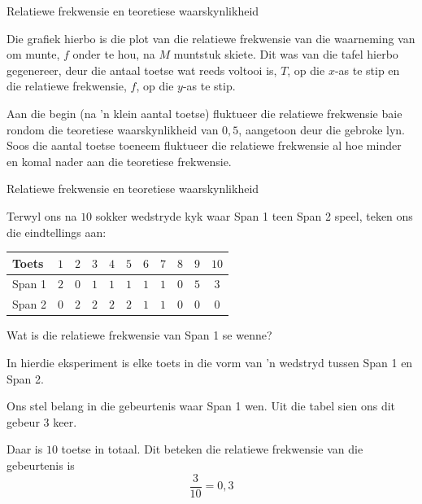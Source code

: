 \begin{wex}{Relatiewe frekwensie en teoretiese waarskynlikheid}
{Die grafiek hierbo is die plot van die relatiewe frekwensie van die waarneming van om munte, $ f $ onder te hou,
na $ M $ muntstuk skiete. Dit was van die tafel hierbo gegenereer, deur die antaal toetse wat reeds voltooi is, $ T $, op die
$ x $-as te stip en die relatiewe frekwensie, $ f $, op die $ y $-as te stip.

Aan die begin (na 'n klein aantal toetse) fluktueer die relatiewe frekwensie baie rondom die teoretiese waarskynlikheid van $0,5$, aangetoon deur die gebroke lyn. Soos die aantal toetse toeneem fluktueer die relatiewe frekwensie al hoe minder en komal nader aan die teoretiese frekwensie.


}
\end{wex}


\begin{wex}{Relatiewe frekwensie en teoretiese waarskynlikheid}{
  Terwyl ons na $10$ sokker wedstryde kyk waar Span 1 teen Span 2 speel, teken ons die eindtellings aan:
    \begin{center}
      \begin{tabular}{lcccccccccc}
        \toprule
        Toets  & $1$ & $2$ & $3$ & $4$ & $5$ & $6$ & $7$ & $8$ & $9$ & $10$ \\
        \midrule
        Span 1 & $2$ & $0$ & $1$ & $1$ & $1$ & $1$ & $1$ & $0$ & $5$ & $3$ \\
        Span 2 & $0$ & $2$ & $2$ & $2$ & $2$ & $1$ & $1$ & $0$ & $0$ & $0$ \\
        \bottomrule
      \end{tabular}
    \end{center}
  Wat is die relatiewe frekwensie van Span 1 se wenne?
}{
  In hierdie eksperiment is elke toets in die vorm van 'n wedstryd tussen Span 1 en Span 2.


  Ons stel belang in die gebeurtenis waar Span 1 wen. Uit die tabel sien ons dit gebeur $3$ keer.


  Daar is $10$ toetse in totaal. Dit beteken die relatiewe frekwensie van die gebeurtenis is \[\frac{3}{10} = 0,3\]
}
\end{wex}

